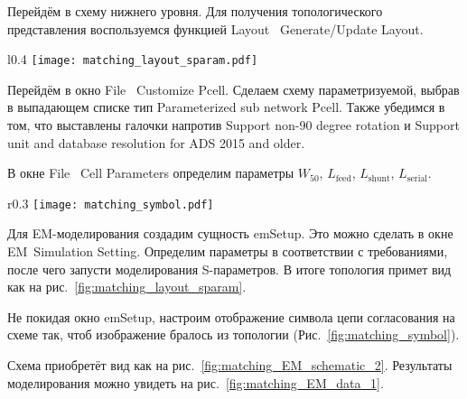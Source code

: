 Перейдём в схему нижнего уровня. Для получения топологического представления воспользуемся функцией Layout \textrightarrow\ Generate/Update Layout.

\begin{wrapfigure}{l}{0.4\textwidth}
    \centering
    \texttt{[image: matching\_layout\_sparam.pdf]}
    \caption{Топологическое представление после EM-моделирования}%
    \label{fig:matching_layout_sparam}
\end{wrapfigure}

\begin{comment}
Топологическое представление создано верно (Рис.~\ref{fig:matching_layout_check}).

\begin{wrapfigure}{r}{0.4\textwidth}
    \centering
    \texttt{[image: matching\_layout\_check.pdf]}
    \caption{Проверка топологического представления}%
    \label{fig:matching_layout_check}
\end{wrapfigure}
\end{comment}

Перейдём в окно File \textrightarrow\ Customize Pcell.
Сделаем схему параметризуемой, выбрав в выпадающем списке тип Parameterized sub network Pcell.
Также убедимся в том, что выставлены галочки напротив Support non-90 degree rotation и Support unit and database resolution for ADS 2015 and older.

В окне File \textrightarrow\ Cell Parameters определим параметры $W_{50}$, $L_\text{feed}$, $L_\text{shunt}$, $L_\text{serial}$.

\begin{wrapfigure}{r}{0.3\textwidth}
    \centering
    \texttt{[image: matching\_symbol.pdf]}
    \caption{Обновлённый символ}%
    \label{fig:matching_symbol}
\end{wrapfigure}

Для EM-моделирования создадим сущность emSetup.
Это можно сделать в окне EM\textrightarrow\ Simulation Setting.
Определим параметры в соответствии с требованиями, после чего запусти моделирования S-параметров.
В итоге топология примет вид как на рис.~\ref{fig:matching_layout_sparam}.

Не покидая окно emSetup, настроим отображение символа цепи согласования на схеме так, чтоб изображение бралось из топологии (Рис.~\ref{fig:matching_symbol}).

Схема приобретёт вид как на рис.~\ref{fig:matching_EM_schematic_2}. Результаты моделирования можно увидеть на рис.~\ref{fig:matching_EM_data_1}.


